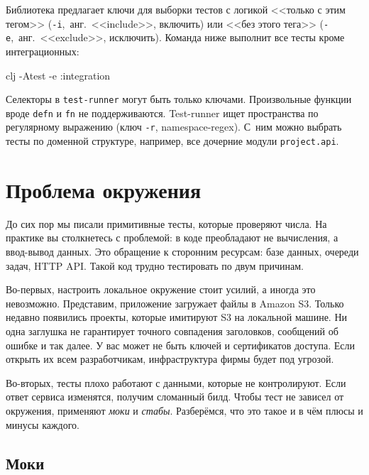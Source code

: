 Библиотека предлагает ключи для выборки тестов с логикой <<только с этим тегом>>
(\verb|-i|,~анг.~<<include>>, включить) или <<без этого тега>>
(\verb|-e|,~анг.~<<exclude>>, исключить). Команда ниже выполнит все тесты кроме
интеграционных:

\begin{english}
  \begin{bash}
clj -Atest -e :integration
  \end{bash}
\end{english}

Селекторы в \verb|test-runner| могут быть только ключами. Произвольные функции
вроде \verb|defn| и \verb|fn| не поддерживаются. Test-runner ищет пространства
по регулярному выражению (ключ \verb|-r|, namespace-regex). С~ним можно выбрать
тесты по доменной структуре, например, все дочерние модули \verb|project.api|.

\section{Проблема окружения}


До сих пор мы писали примитивные тесты, которые проверяют числа. На практике вы
столкнетесь с проблемой: в коде преобладают не вычисления, а ввод-вывод
данных. Это обращение к сторонним ресурсам: базе данных, очереди задач, HTTP
API. Такой код трудно тестировать по двум причинам.


Во-первых, настроить локальное окружение стоит усилий, а иногда это
невозможно. Представим, приложение загружает файлы в Amazon S3. Только недавно
появились проекты, которые имитируют S3 на локальной машине. Ни одна заглушка не
гарантирует точного совпадения заголовков, сообщений об ошибке и так далее. У
вас может не быть ключей и сертификатов доступа. Если открыть их всем
разработчикам, инфраструктура фирмы будет под угрозой.

Во-вторых, тесты плохо работают с данными, которые не контролируют. Если ответ
сервиса изменятся, получим сломанный билд. Чтобы тест не зависел от окружения,
применяют \emph{моки} и \emph{стабы}. Разберёмся, что это такое и в чём плюсы и
минусы каждого.

\subsection{Моки}

